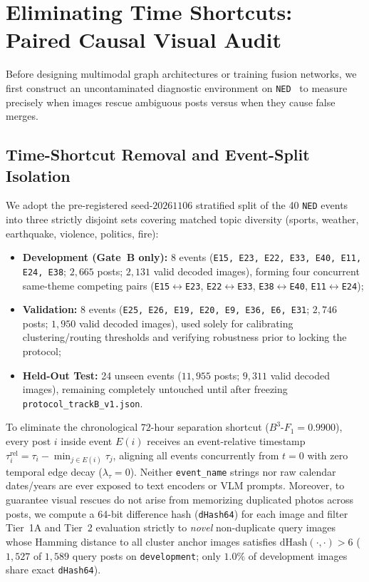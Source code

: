 \section{Eliminating Time Shortcuts: Paired Causal Visual Audit}
\label{sec:diagnosis}

Before designing multimodal graph architectures or training fusion networks, we first construct an uncontaminated diagnostic environment on \texttt{NED}~\cite{lin2024ned} to measure precisely when images rescue ambiguous posts versus when they cause false merges.

\subsection{Time-Shortcut Removal and Event-Split Isolation}
\label{sec:setup_splits}

We adopt the pre-registered seed-$20261106$ stratified split of the 40 \texttt{NED} events into three strictly disjoint sets covering matched topic diversity (sports, weather, earthquake, violence, politics, fire):
\begin{itemize}
    \item \textbf{Development (Gate~B only):} 8 events (\texttt{E15, E23, E22, E33, E40, E11, E24, E38}; $2{,}665$ posts; $2{,}131$ valid decoded images), forming four concurrent same-theme competing pairs (\texttt{E15}$\leftrightarrow$\texttt{E23}, \texttt{E22}$\leftrightarrow$\texttt{E33}, \texttt{E38}$\leftrightarrow$\texttt{E40}, \texttt{E11}$\leftrightarrow$\texttt{E24});
    \item \textbf{Validation:} 8 events (\texttt{E25, E26, E19, E20, E9, E36, E6, E31}; $2{,}746$ posts; $1{,}950$ valid decoded images), used solely for calibrating clustering/routing thresholds and verifying robustness prior to locking the protocol;
    \item \textbf{Held-Out Test:} 24 unseen events ($11{,}955$ posts; $9{,}311$ valid decoded images), remaining completely untouched until after freezing \texttt{protocol\_trackB\_v1.json}.
\end{itemize}
To eliminate the chronological $72$-hour separation shortcut ($B^3\text{-}F_1 = 0.9900$), every post $i$ inside event $E(i)$ receives an event-relative timestamp $\tau^{\text{rel}}_i = \tau_i - \min_{j \in E(i)} \tau_j$, aligning all events concurrently from $t=0$ with zero temporal edge decay ($\lambda_\tau = 0$). Neither \texttt{event\_name} strings nor raw calendar dates/years are ever exposed to text encoders or VLM prompts. Moreover, to guarantee visual rescues do not arise from memorizing duplicated photos across posts, we compute a 64-bit difference hash (\texttt{dHash64}) for each image and filter Tier~1A and Tier~2 evaluation strictly to \emph{novel} non-duplicate query images whose Hamming distance to all cluster anchor images satisfies $\mathrm{dHash}(\cdot,\cdot) > 6$ ($1{,}527$ of $1{,}589$ query posts on \texttt{development}; only $1.0\%$ of development images share exact \texttt{dHash64}).

